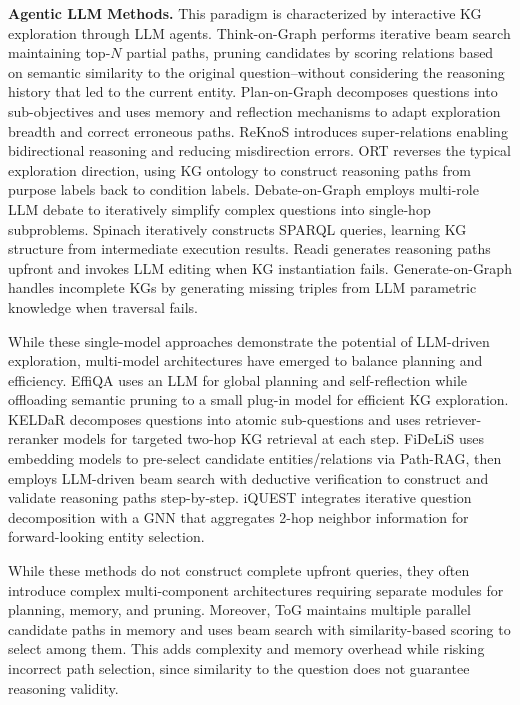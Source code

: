 \documentclass[sigconf]{acmart}
\begin{document}
\noindent \textbf{Agentic LLM Methods. }
This paradigm is characterized by interactive KG exploration through LLM agents. Think-on-Graph \citep{sun2024thinkongraph} performs iterative beam search maintaining top-$N$ partial paths, pruning candidates by scoring relations based on semantic similarity to the original question--without considering the reasoning history that led to the current entity. Plan-on-Graph \citep{chen2024plan} decomposes questions into sub-objectives and uses memory and reflection mechanisms to adapt exploration breadth and correct erroneous paths. ReKnoS \citep{wang2025reasoning} introduces super-relations enabling bidirectional reasoning and reducing misdirection errors. ORT \citep{liu2025ontology} reverses the typical exploration direction, using KG ontology to construct reasoning paths from purpose labels back to condition labels. Debate-on-Graph \citep{ma2025debate} employs multi-role LLM debate to iteratively simplify complex questions into single-hop subproblems. Spinach \citep{liu2024spinach} iteratively constructs SPARQL queries, learning KG structure from intermediate execution results. Readi \citep{cheng2024call} generates reasoning paths upfront and invokes LLM editing when KG instantiation fails. Generate-on-Graph \citep{xu2024generate} handles incomplete KGs by generating missing triples from LLM parametric knowledge when traversal fails.

While these single-model approaches demonstrate the potential of LLM-driven exploration, multi-model architectures have emerged to balance planning and efficiency. EffiQA \citep{dong-etal-2025-effiqa} uses an LLM for global planning and self-reflection while offloading semantic pruning to a small plug-in model for efficient KG exploration. KELDaR \citep{li2024framework} decomposes questions into atomic sub-questions and uses retriever-reranker models for targeted two-hop KG retrieval at each step. FiDeLiS \citep{sui2024fidelis} uses embedding models to pre-select candidate entities/relations via Path-RAG, then employs LLM-driven beam search with deductive verification to construct and validate reasoning paths step-by-step. iQUEST \citep{wang2025iquest} integrates iterative question decomposition with a GNN that aggregates 2-hop neighbor information for forward-looking entity selection. 

While these methods do not construct complete upfront queries, they often introduce complex multi-component architectures requiring separate modules for planning, memory, and pruning. Moreover, ToG maintains multiple parallel candidate paths in memory and uses beam search with similarity-based scoring to select among them. This adds complexity and memory overhead while risking incorrect path selection, since similarity to the question does not guarantee reasoning validity. %
\end{document}
